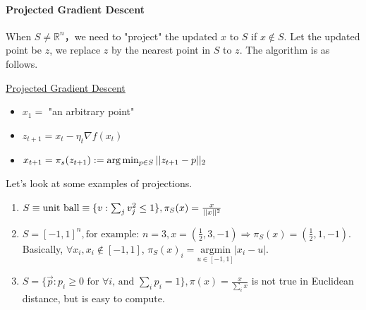 \documentclass[11pt]{article}
\begin{document}
\paragraph{Projected Gradient Descent}
When $S \neq \mathbb{R}^n$，we need to "project" the updated $x$ to $S$ if $x \not\in S$. 
Let the updated point be $z$, we replace $z$ by the nearest point in $S$ to $z$. The algorithm is as follows.
\begin{mdframed}[backgroundcolor=blue!05,topline=false,bottomline=false,leftline=false,rightline=false] 
	\underline{\sc Projected Gradient Descent}
	\begin{itemize}
		\item $x_1 = $ "an arbitrary point" 
		\item $z_{t+1} = x_t - \eta_{t}\nabla f(x_t)$
		\item $x_{t+1} = \pi_{s}(z_{t+1}) := \arg \min_{p\in S} ||z_{t+1}-p||_2  $
	\end{itemize}
\end{mdframed}
Let's look at some examples of projections.

\begin{enumerate}
    \item $S \equiv \text{unit ball} \equiv \{v: \sum_j v_j^2 \leq 1\}, \pi_S(x) = \frac{x}{||x||^2}$
    \item $S = [-1,1]^n, \text{for example: } n=3, x= (\frac{1}{2}, 3, -1) \Rightarrow \pi_S(x) = (\frac{1}{2}, 1, -1)$. Basically, $\forall x_i, x_i \notin [-1,1]$, $\pi_S(x)_i = \underset{u \in [-1,1]}{\text{argmin}} |x_i - u|$.
    \item $S = \{\Vec{p}: p_i \geq 0 \text{ for } \forall i \text{, and } \sum_i p_{i}=1 \}, \pi(x) = \frac{x}{\sum_i x} $ is not true in Euclidean distance, but is easy to compute.
\end{enumerate}
\end{document}
